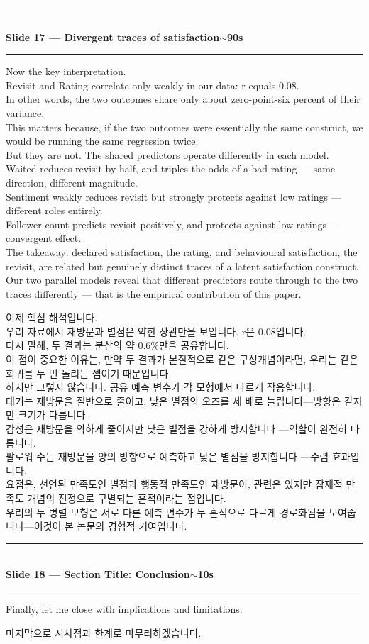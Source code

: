 \documentclass[10pt,a4paper]{article}
\newcommand{\sechead}[2]{%
  \vspace{6pt}%
  \noindent\rule{\linewidth}{0.6pt}\\[1pt]
  {\small\bfseries #1\hfill #2}\\[-3pt]
  \rule{\linewidth}{0.4pt}\par\vspace{2pt}%
}
\newcommand{\sent}[1]{#1\\[5pt]}
\newcommand{\bilingual}[2]{%
  \noindent%
  \begin{minipage}[t]{0.485\linewidth}
    \small #1
  \end{minipage}\hfill\vrule\hfill%
  \begin{minipage}[t]{0.483\linewidth}
    \small #2
  \end{minipage}\par\vspace{4pt}%
}
\begin{document}
\sechead{Slide 17 --- Divergent traces of satisfaction}{$\sim$90s}

\bilingual{%
\sent{Now the key interpretation.}
\sent{Revisit and Rating correlate only weakly in our data: r equals
0.08.}
\sent{In other words, the two outcomes share only about zero-point-six
percent of their variance.}
\sent{This matters because, if the two outcomes were essentially the
same construct, we would be running the same regression twice.}
\sent{But they are not. The shared predictors operate differently in
each model.}
\sent{Waited reduces revisit by half, and triples the odds of a bad
rating --- same direction, different magnitude.}
\sent{Sentiment weakly reduces revisit but strongly protects against low
ratings --- different roles entirely.}
\sent{Follower count predicts revisit positively, and protects against
low ratings --- convergent effect.}
\sent{The takeaway: declared satisfaction, the rating, and behavioural
satisfaction, the revisit, are related but genuinely distinct traces of
a latent satisfaction construct.}
\sent{Our two parallel models reveal that different predictors route
through to the two traces differently --- that is the empirical
contribution of this paper.}
}{%
\sent{이제 핵심 해석입니다.}
\sent{우리 자료에서 재방문과 별점은 약한 상관만을 보입니다. r은
0.08입니다.}
\sent{다시 말해, 두 결과는 분산의 약 0.6\%만을 공유합니다.}
\sent{이 점이 중요한 이유는, 만약 두 결과가 본질적으로 같은 구성개념이라면,
우리는 같은 회귀를 두 번 돌리는 셈이기 때문입니다.}
\sent{하지만 그렇지 않습니다. 공유 예측 변수가 각 모형에서 다르게 작용합니다.}
\sent{대기는 재방문을 절반으로 줄이고, 낮은 별점의 오즈를 세 배로
늘립니다---방향은 같지만 크기가 다릅니다.}
\sent{감성은 재방문을 약하게 줄이지만 낮은 별점을 강하게 방지합니다
---역할이 완전히 다릅니다.}
\sent{팔로워 수는 재방문을 양의 방향으로 예측하고 낮은 별점을 방지합니다
---수렴 효과입니다.}
\sent{요점은, 선언된 만족도인 별점과 행동적 만족도인 재방문이, 관련은
있지만 잠재적 만족도 개념의 진정으로 구별되는 흔적이라는 점입니다.}
\sent{우리의 두 병렬 모형은 서로 다른 예측 변수가 두 흔적으로 다르게
경로화됨을 보여줍니다---이것이 본 논문의 경험적 기여입니다.}
}

\sechead{Slide 18 --- Section Title: Conclusion}{$\sim$10s}

\bilingual{%
\sent{Finally, let me close with implications and limitations.}
}{%
\sent{마지막으로 시사점과 한계로 마무리하겠습니다.}
}
\end{document}

